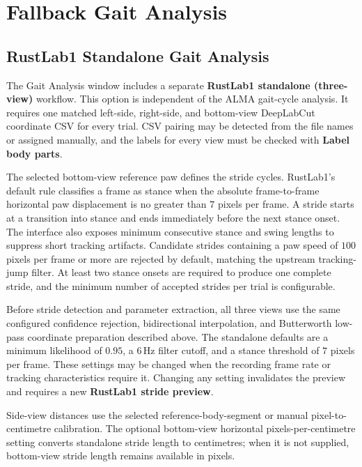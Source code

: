 \documentclass[11pt]{article}
\renewcommand{\[}{%
  \par\smallskip\noindent
  \begin{center}%
  \setlength{\fboxsep}{5pt}%
  \setlength{\fboxrule}{0.35pt}%
  \begin{lrbox}{\almaEquationBox}%
  $\displaystyle
}
\renewcommand{\]}{%
  $%
  \end{lrbox}%
  \fcolorbox{equationLine}{equationBack}{\usebox{\almaEquationBox}}%
  \end{center}%
  \smallskip\par
}
\begin{document}
\section{Fallback Gait Analysis}

\subsection{RustLab1 Standalone Gait Analysis}

The Gait Analysis window includes a separate \textbf{RustLab1 standalone
(three-view)} workflow. This option is independent of the ALMA gait-cycle
analysis. It requires one matched left-side, right-side, and bottom-view
DeepLabCut coordinate CSV for every trial. CSV pairing may be detected from the
file names or assigned manually, and the labels for every view must be checked
with \textbf{Label body parts}.

The selected bottom-view reference paw defines the stride cycles. RustLab1's
default rule classifies a frame as stance when the absolute frame-to-frame
horizontal paw displacement is no greater than $7$ pixels per frame. A stride
starts at a transition into stance and ends immediately before the next stance
onset. The interface also exposes minimum consecutive stance and swing lengths
to suppress short tracking artifacts. Candidate strides containing a paw speed
of $100$ pixels per frame or more are rejected by default, matching the
upstream tracking-jump filter. At least two stance onsets are required to
produce one complete stride, and the minimum number of accepted strides per
trial is configurable.

Before stride detection and parameter extraction, all three views use the same
configured confidence rejection, bidirectional interpolation, and Butterworth
low-pass coordinate preparation described above. The standalone defaults are a
minimum likelihood of $0.95$, a $6\,\mathrm{Hz}$ filter cutoff, and a stance
threshold of $7$ pixels per frame. These settings may be changed when the
recording frame rate or tracking characteristics require it. Changing any
setting invalidates the preview and requires a new
\textbf{RustLab1 stride preview}.

Side-view distances use the selected reference-body-segment or manual
pixel-to-centimetre calibration. The optional bottom-view horizontal
pixels-per-centimetre setting converts standalone stride length to centimetres;
when it is not supplied, bottom-view stride length remains available in pixels.
\end{document}
